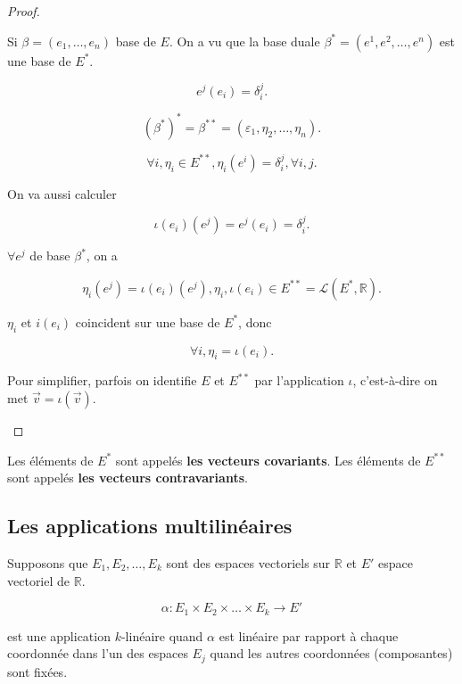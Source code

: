 \documentclass[french]{article}
\theoremstyle{definition}
\theoremstyle{remark}
\begin{document}
\begin{proof}
\begin{enumerate}
    Si $\beta = (e_1, \dots, e_n)$ base de $E$. On a vu que la base duale $\beta ^{*} = (e ^{1}, e ^2, \dots, e ^{n})$ est une base de $E ^{*}$.

    \[
    e ^{j}(e_i) = \delta_i ^{j}.
    \]

    \[
    (\beta ^{*}) ^{*} = \beta ^{**} = (\varepsilon_1, \eta_2, \dots, \eta_n).
    \]

    \begin{equation} \label{base1}
      \forall i, \eta_i \in E ^{**}, \eta_i(e ^{i}) = \delta_i ^{j}, \forall i, j.
    \end{equation}

    On va aussi calculer

    \begin{equation} \label{base2}
      \iota(e_i)(e ^{j}) = e ^{j}(e_i) = \delta_i ^{j}.
    \end{equation}

    $\forall e ^{j}$ de base $\beta ^{*}$, on a

    \[
    \eta_i(e ^{j}) = \iota(e_i)(e ^{j}), \eta_i, \iota(e_i) \in E ^{**} = \mathscr{L}(E ^{*}, \mathbb{R}).
    \]

    $\eta _i$ et $i(e_i)$ coincident sur une base de $E ^{*}$, donc

    \[
    \forall i, \eta_i = \iota(e_i).
    \]

    Pour simplifier, parfois on identifie $E$ et $E ^{**}$ par l'application $\iota$, c'est-à-dire on met $\overrightarrow{ v } = \iota(\overrightarrow{ v })$.
  \end{enumerate}
\end{proof}

Les éléments de $E ^{*}$ sont appelés \textbf{les vecteurs covariants}. Les éléments de $E ^{**}$ sont appelés \textbf{les vecteurs contravariants}.

\subsection{Les applications multilinéaires}

Supposons que $E_1, E_2, \dots, E_k$ sont des espaces vectoriels sur $\mathbb{R}$ et $E'$ espace vectoriel de $\mathbb{R}$.

\[
\alpha : E_1 \times E_2 \times \dots \times E_k \longrightarrow E'
\]

est une application $k$-linéaire quand $\alpha$ est linéaire par rapport à chaque coordonnée dans l'un des espaces $E_j$ quand les autres coordonnées (composantes) sont fixées.
\end{document}
